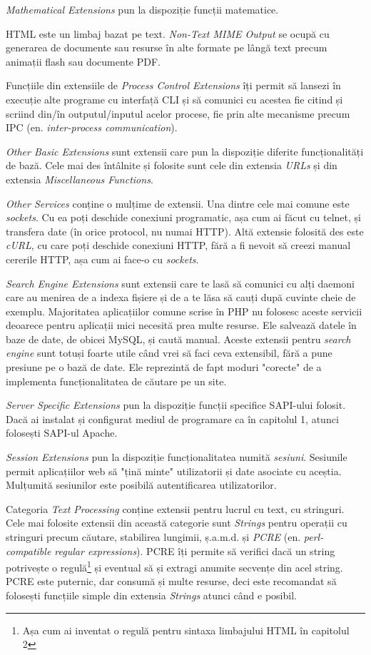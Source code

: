 \textit{Mathematical Extensions} pun la dispoziție
funcții matematice.

HTML este un limbaj bazat pe text.
\textit{Non-Text MIME Output} se ocupă cu
generarea de documente sau resurse în alte formate pe
lângă text precum animații flash sau documente PDF.

Funcțiile din extensiile de \textit{Process Control Extensions}
îți permit să lansezi în execuție alte programe cu interfață
CLI și să
comunici cu acestea fie citind și scriind din/în outputul/inputul
acelor procese, fie prin alte mecanisme precum IPC
(en. \textsl{inter-process communication}).

\textit{Other Basic Extensions} sunt extensii care pun
la dispoziție diferite funcționalități de bază.
Cele mai des întâlnite și folosite sunt cele din
extensia \textit{URLs} și din extensia \textit{Miscellaneous Functions}.

\textit{Other Services} conține o mulțime de extensii. Una dintre
cele mai comune este \textit{sockets}. Cu ea poți deschide
conexiuni programatic, așa cum ai făcut cu telnet, și transfera
date (în orice protocol, nu numai HTTP). Altă extensie folosită des
este \textit{cURL}, cu care poți deschide conexiuni HTTP, fără
a fi nevoit să creezi manual cererile HTTP, așa cum ai face-o cu
\textit{sockets}.

\textit{Search Engine Extensions} sunt extensii care te lasă
să comunici cu alți daemoni care au menirea de a indexa
fișiere și de a te lăsa să cauți după cuvinte cheie de
exemplu. Majoritatea aplicațiilor comune scrise în PHP
nu folosesc aceste servicii deoarece pentru aplicații mici
necesită prea multe resurse. Ele salvează datele în baze de
date, de obicei MySQL, și caută manual. Aceste extensii
pentru \textit{search engine} sunt totuși foarte
utile când vrei să faci ceva extensibil, fără a pune
presiune pe o bază de date. Ele reprezintă de fapt moduri "corecte"
de a implementa funcționalitatea de căutare pe un site.

\textit{Server Specific Extensions} pun la dispoziție
funcții specifice SAPI-ului folosit. Dacă ai instalat
și configurat mediul de programare ca în capitolul 1,
atunci folosești SAPI-ul Apache.

\textit{Session Extensions} pun la dispoziție funcționalitatea
numită \textsl{sesiuni}. Sesiunile permit aplicațiilor web
să "țină minte" utilizatorii și date asociate cu aceștia.
Mulțumită sesiunilor este posibilă autentificarea utilizatorilor.

Categoria \textit{Text Processing} conține extensii pentru
lucrul cu text, cu stringuri. Cele mai folosite extensii
din această categorie sunt \textit{Strings} pentru operații
cu stringuri precum căutare, stabilirea lungimii, ș.a.m.d.
și \textit{PCRE} (en. \textsl{perl-compatible regular expressions}).
PCRE îți permite să verifici dacă un string potrivește o
regulă\footnote{Așa cum ai inventat o regulă pentru
sintaxa limbajului HTML în capitolul 2} și eventual
să și extragi anumite secvențe din acel string.\\
PCRE este puternic, dar consumă și multe resurse,
deci este recomandat să folosești funcțiile simple
din extensia \textit{Strings} atunci când e posibil.

